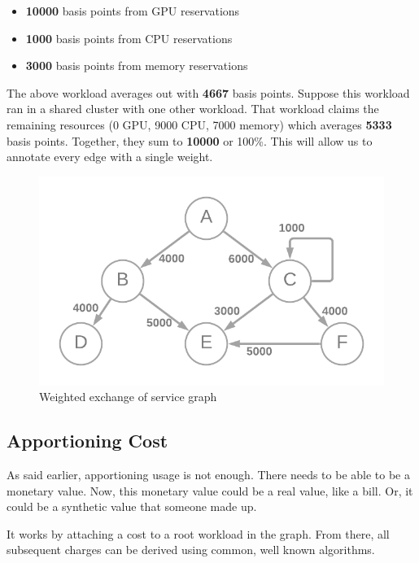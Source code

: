\documentclass[10pt, a4paper, twocolumn]{article}
\begin{document}
    \begin{itemize}
      \item \textbf{10000} basis points from GPU reservations
      \item \textbf{1000} basis points from CPU reservations
      \item \textbf{3000} basis points from memory reservations
    \end{itemize}

    The above workload averages out with \textbf{4667} basis points.
    Suppose this workload ran in a shared cluster with one other workload.
    That workload claims the remaining resources (0 GPU, 9000 CPU, 7000 memory) which averages \textbf{5333} basis points.
    Together, they sum to \textbf{10000} or 100\%.
    This will allow us to annotate every edge with a single weight.

    \begin{figure}[H]
      \centering
      \includegraphics[width=\linewidth]{./cost-attribution-graph-weighted.png}
      \caption{Weighted exchange of service graph}
      \label{figure:3}
    \end{figure}

  \subsection*{Apportioning Cost}
    As said earlier, apportioning usage is not enough.
    There needs to be able to be a monetary value.
    Now, this monetary value could be a real value, like a bill.
    Or, it could be a synthetic value that someone made up.

    It works by attaching a cost to a root workload in the graph.
    From there, all subsequent charges can be derived using common, well known algorithms.
\end{document}
